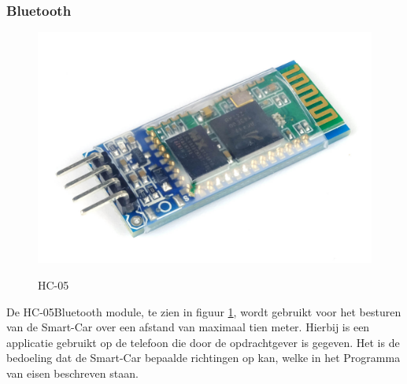 \subsubsection{Bluetooth}\begin{figure}[h]
    \centering
    \includegraphics[scale = 0.08]{Media/Figuren/HC-05_hardware.jpg}
    \caption{HC-05}
    \label{HC-05}
    \cite{HC-05-image-fysiek-RL} 
\end{figure}

De HC-05\gls{Bluetooth} module, te zien in figuur \ref{HC-05}\cite{HC-05-image-fysiek-RL}, wordt gebruikt voor het besturen van de \gls{Smart-Car} over een afstand van maximaal tien meter. Hierbij is een applicatie gebruikt op de telefoon die door de opdrachtgever is gegeven. Het is de bedoeling dat de \gls{Smart-Car} bepaalde richtingen op kan, welke in het Programma van eisen beschreven staan. 

